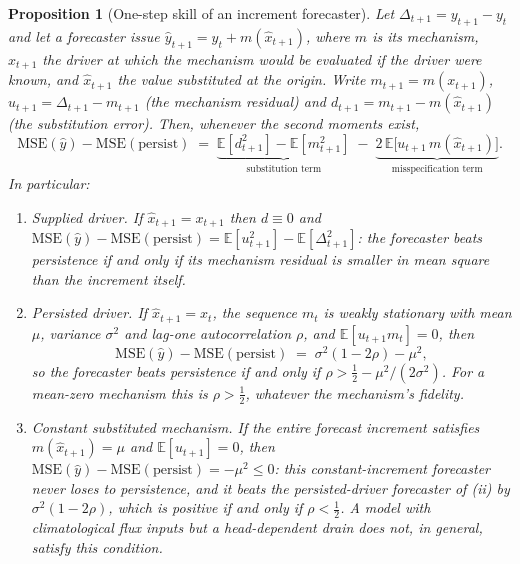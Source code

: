 \documentclass[preprint,11pt,authoryear]{elsarticle}
\newtheorem{proposition}{Proposition}
\theoremstyle{definition}
\theoremstyle{remark}
\newcommand{\MSE}{\mathrm{MSE}}
\newcommand{\pers}{\mathrm{persist}}
\newcommand{\E}{\mathbb{E}}
\begin{document}
\begin{proposition}[One-step skill of an increment forecaster]\label{prop:increment}
Let $\Delta_{t+1}=y_{t+1}-y_t$ and let a forecaster issue $\hat y_{t+1}=y_t+m(\hat x_{t+1})$, where $m$ is its mechanism, $x_{t+1}$ the driver at which the mechanism would be evaluated if the driver were known, and $\hat x_{t+1}$ the value substituted at the origin. Write $m_{t+1}=m(x_{t+1})$, $u_{t+1}=\Delta_{t+1}-m_{t+1}$ (the mechanism residual) and $d_{t+1}=m_{t+1}-m(\hat x_{t+1})$ (the substitution error). Then, whenever the second moments exist,
\begin{equation}\label{eq:decomp}
\MSE(\hat y)-\MSE(\pers)\;=\;\underbrace{\E[d_{t+1}^2]-\E[m_{t+1}^2]}_{\text{substitution term}}\;-\;\underbrace{2\,\E\bigl[u_{t+1}\,m(\hat x_{t+1})\bigr]}_{\text{misspecification term}} .
\end{equation}
In particular:
\begin{enumerate}[label=(\roman*),leftmargin=2.2em,itemsep=2pt]
\item \emph{Supplied driver.} If $\hat x_{t+1}=x_{t+1}$ then $d\equiv0$ and $\MSE(\hat y)-\MSE(\pers)=\E[u_{t+1}^2]-\E[\Delta_{t+1}^2]$: the forecaster beats persistence if and only if its mechanism residual is smaller in mean square than the increment itself.
\item \emph{Persisted driver.} If $\hat x_{t+1}=x_t$, the sequence $m_t$ is weakly stationary with mean $\mu$, variance $\sigma^2$ and lag-one autocorrelation $\rho$, and $\E[u_{t+1}m_t]=0$, then
\[\MSE(\hat y)-\MSE(\pers)\;=\;\sigma^2(1-2\rho)-\mu^2,\]
so the forecaster beats persistence if and only if $\rho>\tfrac12-\mu^2/(2\sigma^2)$. For a mean-zero mechanism this is $\rho>\tfrac12$, whatever the mechanism's fidelity.
\item \emph{Constant substituted mechanism.} If the entire forecast increment satisfies $m(\hat x_{t+1})=\mu$ and $\E[u_{t+1}]=0$, then $\MSE(\hat y)-\MSE(\pers)=-\mu^2\le0$: this constant-increment forecaster never loses to persistence, and it beats the persisted-driver forecaster of (ii) by $\sigma^2(1-2\rho)$, which is positive if and only if $\rho<\tfrac12$. A model with climatological flux inputs but a head-dependent drain does not, in general, satisfy this condition.
\end{enumerate}
\end{proposition}
\end{document}
